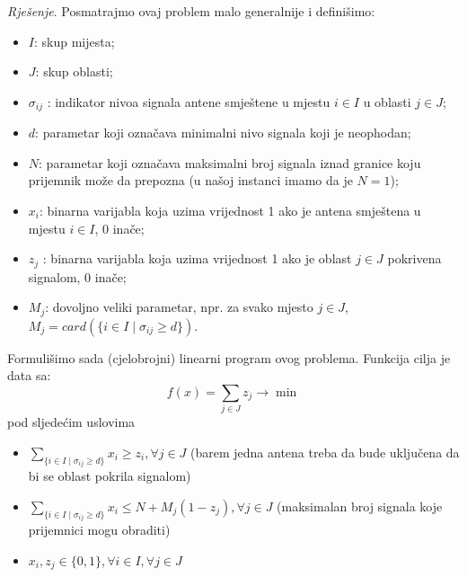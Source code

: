 \documentclass[a4paper, utf8, 11pt, colorlinks]{book}
\begin{document}
\emph{Rješenje}. Posmatrajmo ovaj problem malo generalnije i definišimo: 
\begin{itemize}
    \item $I$: skup mijesta;
    \item $J$: skup oblasti;
    \item $\sigma_{ij}$ : indikator nivoa signala antene   smještene u mjestu $i \in I$ u oblasti $j \in J$;
    \item $d$: parametar koji označava minimalni nivo signala koji je neophodan;
    \item $N$: parametar koji označava maksimalni broj signala iznad granice koju prijemnik može da prepozna (u našoj instanci imamo da je $N=1$);
    \item $x_i$: binarna varijabla koja uzima vrijednost 1 ako je antena smještena u mjestu $i\in I$, 0 inače;
    \item  $z_j$ : binarna varijabla koja uzima vrijednost 1 ako je oblast $j \in J$ pokrivena signalom, 0 inače;
    \item $M_j$: dovoljno veliki parametar, npr. za svako mjesto $j \in J$, $M_j= card(\{ i \in I \mid \sigma_{ij} \geq d\})$.
 \end{itemize}
Formulišimo sada (cjelobrojni) linearni program ovog problema. 
Funkcija cilja je data sa:
$$ f(x) = \sum_{j \in J} z_j \rightarrow \min $$
pod sljedećim uslovima 
\begin{itemize}
    \item  $ \sum_{\{i \in I \mid \sigma_{ij} \geq d \}} x_i \geq z_i, \forall j \in J $ (barem jedna antena treba da bude uključena da bi se oblast pokrila signalom)
    \item $ \sum_{\{i \in I \mid \sigma_{ij} \geq d \}} x_i  \leq N + M_j( 1 - z_j), \forall j \in J $ (maksimalan broj signala koje prijemnici mogu obraditi)  
    \item $x_i, z_j \in\{0, 1\}, \forall i \in I, \forall j \in J$
\end{itemize}
\end{document}
